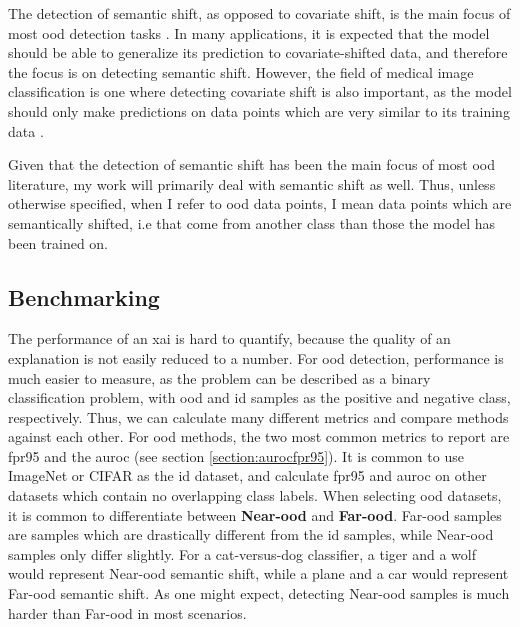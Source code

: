 \documentclass[UKenglish]{uiomasterthesis} %
\theoremstyle{definition}
\begin{document}
The detection of semantic shift, as opposed to covariate shift, is the main focus of most \ac{ood} detection tasks \cite{oodoverview}. In many applications, it is expected that the model should be able to generalize its prediction to covariate-shifted data, and therefore the focus is on detecting semantic shift. However, the field of medical image classification is one where detecting covariate shift is also important, as the model should only make predictions on data points which are very similar to its training data \cite{oodoverview}.

Given that the detection of semantic shift has been the main focus of most \ac{ood} literature, my work will primarily deal with semantic shift as well. Thus, unless otherwise specified, when I refer to \ac{ood} data points, I mean data points which are semantically shifted, i.e that come from another class than those the model has been trained on.

\subsection{Benchmarking}

The performance of an \ac{xai} is hard to quantify, because the quality of an explanation is not easily reduced to a number. For \ac{ood} detection, performance is much easier to measure, as the problem can be described as a binary classification problem, with \ac{ood} and \ac{id} samples as the positive and negative class, respectively. Thus, we can calculate many different metrics and compare methods against each other. For \ac{ood} methods, the two most common metrics to report are \ac{fpr95} and the \ac{auroc} (see section \ref{section:aurocfpr95}). It is common to use ImageNet or CIFAR as the \ac{id} dataset, and calculate \ac{fpr95} and \ac{auroc} on other datasets which contain no overlapping class labels. When selecting \ac{ood} datasets, it is common to differentiate between \textbf{Near-\ac{ood}} and \textbf{Far-\ac{ood}}. Far-\ac{ood} samples are samples which are drastically different from the \ac{id} samples, while Near-\ac{ood} samples only differ slightly. For a cat-versus-dog classifier, a tiger and a wolf would represent Near-\ac{ood} semantic shift, while a plane and a car would represent Far-\ac{ood} semantic shift. As one might expect, detecting Near-\ac{ood} samples is much harder than Far-\ac{ood} in most scenarios.

\end{document}
